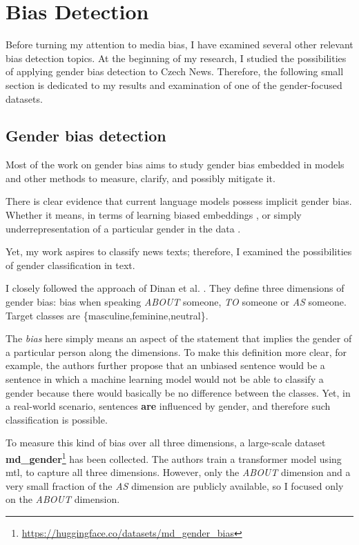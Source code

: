 \chapter{Bias Detection}
Before turning my attention to media bias, I have examined several other relevant bias detection topics. At the beginning of my research, I studied the possibilities of applying gender bias detection to Czech News. Therefore, the following small section is dedicated to my results and examination of one of the gender-focused datasets.


\section{Gender bias detection}\label{gender}
Most of the work on gender bias aims to study gender bias embedded in models and other methods to measure, clarify, and possibly mitigate it.

There is clear evidence that current language models possess implicit gender bias. Whether it means, in terms of learning biased embeddings \cite{bolukbasi2016man}, or simply underrepresentation of a particular gender in the data \cite{sun-peng-2021-men}. 

Yet, my work aspires to classify news texts; therefore, I examined the possibilities of gender classification in text.

I closely followed the approach of Dinan et al. \cite{dinan2020multi}. They define three dimensions of gender bias: bias when speaking \textit{ABOUT} someone, \textit{TO} someone or \textit{AS} someone. Target classes are \{masculine,feminine,neutral\}. 

The \textit{bias} here simply means an aspect of the statement that implies the gender of a particular person along the dimensions. To make this definition more clear, for example, the authors further propose that an unbiased sentence would be a sentence in which a machine learning model would not be able to classify a gender because there would basically be no difference between the classes. Yet, in a real-world scenario, sentences \textbf{are} influenced by gender, and therefore such classification is possible.

To measure this kind of bias over all three dimensions, a large-scale dataset \textbf{md\_gender}\footnote{\url{https://huggingface.co/datasets/md_gender_bias}} has been collected. The authors train a transformer model using \Gls{mtl}, to capture all three dimensions. However, only the \textit{ABOUT} dimension and a very small fraction of the \textit{AS} dimension are publicly available, so I focused only on the \textit{ABOUT} dimension.

